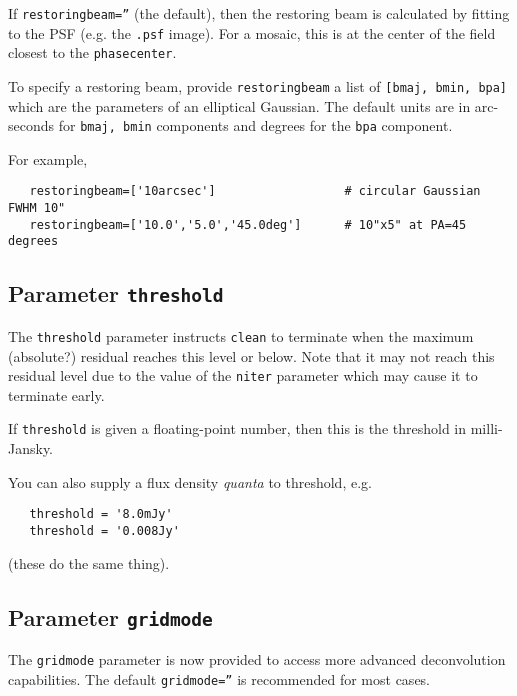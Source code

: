 If {\tt restoringbeam=''} (the default), then the restoring beam
is calculated by fitting to the PSF (e.g. the {\tt .psf} image).
For a mosaic, this is at the center of the field closest to the
{\tt phasecenter}.

To specify a restoring beam, provide {\tt restoringbeam} a list of 
{\tt [bmaj, bmin, bpa]} which are the parameters of an elliptical
Gaussian.  The default units are in arc-seconds for {\tt bmaj, bmin}
components and degrees for the {\tt bpa} component.

For example,
\small
\begin{verbatim}
   restoringbeam=['10arcsec']                  # circular Gaussian FWHM 10"
   restoringbeam=['10.0','5.0','45.0deg']      # 10"x5" at PA=45 degrees
\end{verbatim}
\normalsize

\subsection{Parameter {\tt threshold} }
\label{section:im.clean.thresh}

The {\tt threshold} parameter instructs {\tt clean} to terminate when
the maximum (absolute?) residual reaches this level or below.  Note
that it may not reach this residual level due to the value of the
{\tt niter} parameter which may cause it to terminate early.

If {\tt threshold} is given a floating-point number, then this is the
threshold in milli-Jansky.

You can also supply a flux density {\em quanta} to threshold, e.g.
\small
\begin{verbatim}
   threshold = '8.0mJy'
   threshold = '0.008Jy'
\end{verbatim}
\normalsize
(these do the same thing).

\subsection{Parameter {\tt gridmode} }
\label{section:im.clean.gridmode}

The {\tt gridmode} parameter is now provided to access more
advanced deconvolution capabilities.  The default 
{\tt gridmode=''} is recommended for most cases.

